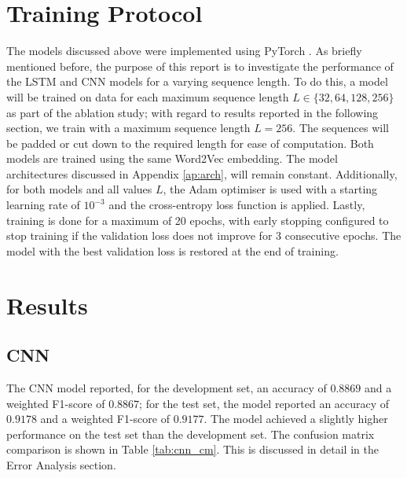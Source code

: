 \documentclass[12pt,a4paper,english]{article}
\begin{document}
\section{Training Protocol}
The models discussed above were implemented using PyTorch \cite{paszke2019pytorchimperativestylehighperformance}. As briefly mentioned before, the purpose of this report is to investigate the performance of the LSTM and CNN models for a varying sequence length. To do this, a model will be trained on data for each maximum sequence length $L \in \{32,64,128,256\}$ as part of the ablation study; with regard to results reported in the following section, we train with a maximum sequence length $L=256$. The sequences will be padded or cut down to the required length for ease of computation. Both models are trained using the same Word2Vec embedding. The model architectures discussed in Appendix \ref{ap:arch}, will remain constant. Additionally, for both models and all values $L$, the Adam optimiser is used with a starting learning rate of $10^{-3}$ and the cross-entropy loss function is applied. Lastly, training is done for a maximum of 20 epochs, with early stopping configured to stop training if the validation loss does not improve for 3 consecutive epochs. The model with the best validation loss is restored at the end of training.

\section{Results}

\subsection{CNN}

The CNN model reported, for the development set, an accuracy of $0.8869$ and a weighted F1-score of $0.8867$; for the test set, the model reported an accuracy of $0.9178$ and a weighted F1-score of $0.9177$. The model achieved a slightly higher performance on the test set than the development set. The confusion matrix comparison is shown in Table \ref{tab:cnn_cm}. This is discussed in detail in the Error Analysis section. 
\end{document}
